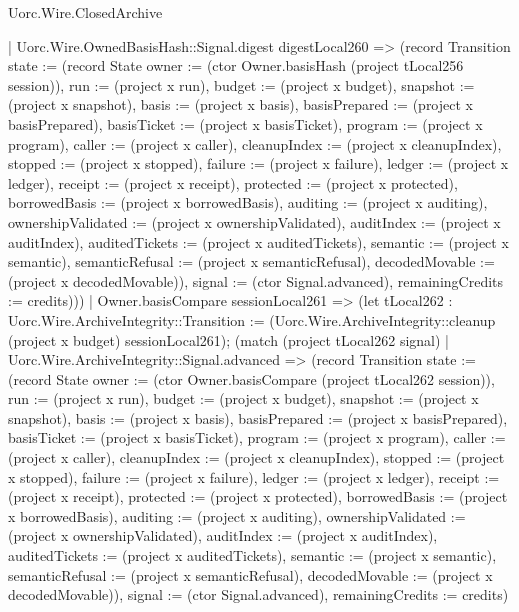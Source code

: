 \begin{lexlean}{Uorc.Wire.ClosedArchive}
\begin{semanticmodule}
{      | Uorc.Wire.OwnedBasisHash::Signal.digest digestLocal260 => (record Transition {state := (record State {owner := (ctor Owner.basisHash (project tLocal256 session)), run := (project x run), budget := (project x budget), snapshot := (project x snapshot), basis := (project x basis), basisPrepared := (project x basisPrepared), basisTicket := (project x basisTicket), program := (project x program), caller := (project x caller), cleanupIndex := (project x cleanupIndex), stopped := (project x stopped), failure := (project x failure), ledger := (project x ledger), receipt := (project x receipt), protected := (project x protected), borrowedBasis := (project x borrowedBasis), auditing := (project x auditing), ownershipValidated := (project x ownershipValidated), auditIndex := (project x auditIndex), auditedTickets := (project x auditedTickets), semantic := (project x semantic), semanticRefusal := (project x semanticRefusal), decodedMovable := (project x decodedMovable)}), signal := (ctor Signal.advanced), remainingCredits := credits})))
    | Owner.basisCompare sessionLocal261 => (let tLocal262 : Uorc.Wire.ArchiveIntegrity::Transition := (Uorc.Wire.ArchiveIntegrity::cleanup (project x budget) sessionLocal261); (match (project tLocal262 signal)
      | Uorc.Wire.ArchiveIntegrity::Signal.advanced => (record Transition {state := (record State {owner := (ctor Owner.basisCompare (project tLocal262 session)), run := (project x run), budget := (project x budget), snapshot := (project x snapshot), basis := (project x basis), basisPrepared := (project x basisPrepared), basisTicket := (project x basisTicket), program := (project x program), caller := (project x caller), cleanupIndex := (project x cleanupIndex), stopped := (project x stopped), failure := (project x failure), ledger := (project x ledger), receipt := (project x receipt), protected := (project x protected), borrowedBasis := (project x borrowedBasis), auditing := (project x auditing), ownershipValidated := (project x ownershipValidated), auditIndex := (project x auditIndex), auditedTickets := (project x auditedTickets), semantic := (project x semantic), semanticRefusal := (project x semanticRefusal), decodedMovable := (project x decodedMovable)}), signal := (ctor Signal.advanced), remainingCredits := credits})
}
\end{semanticmodule}
\end{lexlean}
